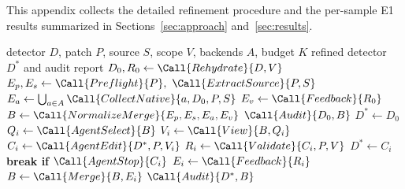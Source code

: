 This appendix collects the detailed refinement procedure and the per-sample E1 results summarized in Sections~\ref{sec:approach} and~\ref{sec:results}.

\begin{algorithm}[t]
\caption{Target-Preserving Evidence-Guided Refinement}
\label{alg:evidence-guided-refinement-appendix}
\begin{algorithmic}[1]
\Require detector $D$, patch $P$, source $S$, scope $V$, backends $A$, budget $K$
\Ensure refined detector $D^*$ and audit report
\State $D_0,R_0 \gets \Call{Rehydrate}{D,V}$
\State $E_p,E_s \gets \Call{Preflight}{P},\ \Call{ExtractSource}{P,S}$
\State $E_a \gets \textstyle\bigcup_{a\in A}\Call{CollectNative}{a,D_0,P,S}$ \quad $E_v \gets \Call{Feedback}{R_0}$
\State $B \gets \Call{NormalizeMerge}{E_p,E_s,E_a,E_v}$
  \State \Return $\Call{Audit}{D_0,B}$
\EndIf
\State $D^* \gets D_0$
  \State $Q_i \gets \Call{AgentSelect}{B}$ \quad $V_i \gets \Call{View}{B,Q_i}$
  \State $C_i \gets \Call{AgentEdit}{D^*,P,V_i}$ \quad $R_i \gets \Call{Validate}{C_i,P,V}$
    \State $D^* \gets C_i$ \quad \textbf{break if} $\Call{AgentStop}{C_i}$
  \Else
    \State $E_i \gets \Call{Feedback}{R_i}$ \quad $B \gets \Call{Merge}{B,E_i}$
  \EndIf
\EndFor
\State \Return $\Call{Audit}{D^*,B}$
\end{algorithmic}
\end{algorithm}

